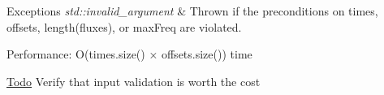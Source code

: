 \begin{DoxyExceptions}{Exceptions}
{\em std::invalid\_\-argument} & Thrown if the preconditions on times, offsets, length(fluxes), or maxFreq are violated.\\
\hline
\end{DoxyExceptions}
\begin{DoxyParagraph}{Performance:}
O(times.size() × offsets.size()) time
\end{DoxyParagraph}
\begin{Desc}
\item[\hyperlink{todo__todo000002}{Todo}]Verify that input validation is worth the cost \end{Desc}
